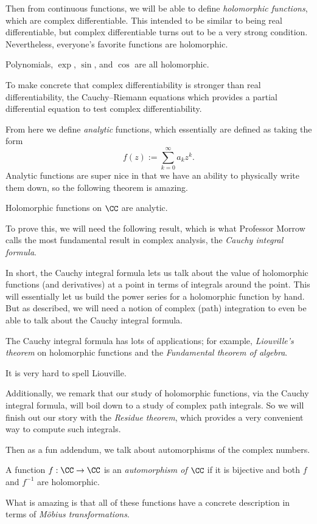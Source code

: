 Then from continuous functions, we will be able to define \textit{holomorphic functions}, which are complex differentiable. This intended to be similar to being real differentiable, but complex differentiable turns out to be a very strong condition. Nevertheless, everyone's favorite functions are holomorphic.
\begin{example}
	Polynomials, $\exp$, $\sin$, and $\cos$ are all holomorphic.
\end{example}
To make concrete that complex differentiability is stronger than real differentiability, the Cauchy--Riemann equations which provides a partial differential equation to test complex differentiability.

From here we define \textit{analytic} functions, which essentially are defined as taking the form
\[f(z):=\sum_{k=0}^\infty a_kz^k.\]
Analytic functions are super nice in that we have an ability to physically write them down, so the following theorem is amazing.
\begin{theorem}
	Holomorphic functions on $\CC$ are analytic.
\end{theorem}
To prove this, we will need the following result, which is what Professor Morrow calls the most fundamental result in complex analysis, the \textit{Cauchy integral formula}.

In short, the Cauchy integral formula lets us talk about the value of holomorphic functions (and derivatives) at a point in terms of integrals around the point. This will essentially let us build the power series for a holomorphic function by hand. But as described, we will need a notion of complex (path) integration to even be able to talk about the Cauchy integral formula.

The Cauchy integral formula has lots of applications; for example, \textit{Liouville's theorem} on holomorphic functions and the \textit{Fundamental theorem of algebra}.
\begin{remark}
	It is very hard to spell Liouville.
\end{remark}
Additionally, we remark that our study of holomorphic functions, via the Cauchy integral formula, will boil down to a study of complex path integrals. So we will finish out our story with the \textit{Residue theorem}, which provides a very convenient way to compute such integrals.

Then as a fun addendum, we talk about automorphisms of the complex numbers.
\begin{definition}
	A function $f:\CC\to\CC$ is an \textit{automorphism of $\CC$} if it is bijective and both $f$ and $f^{-1}$ are holomorphic.
\end{definition}
\noindent What is amazing is that all of these functions have a concrete description in terms of \textit{M\"obius transformations}.

